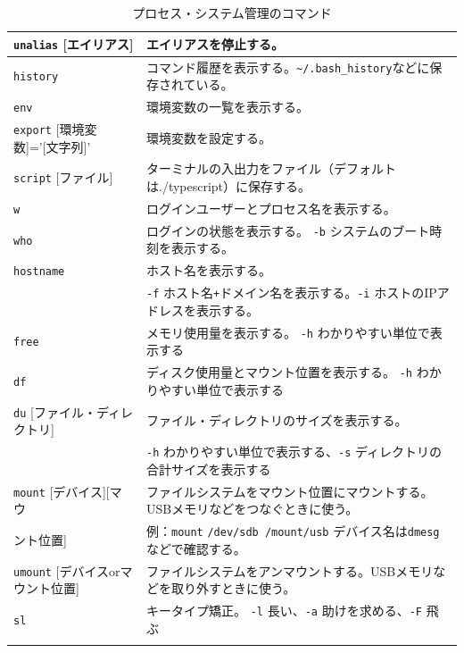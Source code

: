 \documentclass[a4j]{ltjsreport}
\begin{document}
\begin{longtable}[c]{|p{3.5cm}|p{13.5cm}|}
        \hline
        \texttt{unalias} {\small [エイリアス]}&エイリアスを停止する。\\
        \hline
        \texttt{history} &コマンド履歴を表示する。\verb|~/.bash_history|などに保存されている。\\
        \hline
        \texttt{env} &環境変数の一覧を表示する。\\
        \hline
        \texttt{export} [環境変数]='[文字列]'&環境変数を設定する。\\
        \hline
        \texttt{script} [ファイル]&ターミナルの入出力をファイル（デフォルトは./typescript）に保存する。\\
        \hline
        \texttt{w} &ログインユーザーとプロセス名を表示する。\\
        \hline
        \texttt{who} &ログインの状態を表示する。 \texttt{-b} システムのブート時刻を表示する。\\
        \hline
        \texttt{hostname} &ホスト名を表示する。 \\
        &\texttt{-f} ホスト名\verb|+|ドメイン名を表示する。\texttt{-i} ホストのIPアドレスを表示する。\\
        \hline
        \texttt{free} &メモリ使用量を表示する。 \texttt{-h} わかりやすい単位で表示する\\
        \hline
        \texttt{df} &ディスク使用量とマウント位置を表示する。 \texttt{-h} わかりやすい単位で表示する\\
        \hline
        \texttt{du} {\footnotesize [ファイル・ディレクトリ]}&ファイル・ディレクトリのサイズを表示する。\\
        &\texttt{-h} わかりやすい単位で表示する、\texttt{-s} ディレクトリの合計サイズを表示する\\
        \hline
        \texttt{mount} [デバイス][マウ&ファイルシステムをマウント位置にマウントする。USBメモリなどをつなぐときに使う。\\
        ント位置]&例：\texttt{mount} \verb|/dev/sdb /mount/usb|  デバイス名は\texttt{dmesg}などで確認する。\\
        \hline
        \texttt{umount} [デバイスorマウント位置]&ファイルシステムをアンマウントする。USBメモリなどを取り外すときに使う。 \\
        \hline

        \texttt{sl}&キータイプ矯正。 \texttt{-l} 長い、\texttt{-a} 助けを求める、\texttt{-F} 飛ぶ\\
        \hline
        \caption{プロセス・システム管理のコマンド}
    \end{longtable}
\end{document}
